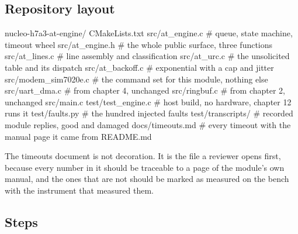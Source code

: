 \subsection*{Repository layout}

\begin{plaincode}
nucleo-h7a3-at-engine/
  CMakeLists.txt
  src/at_engine.c              # queue, state machine, timeout wheel
  src/at_engine.h              # the whole public surface, three functions
  src/at_lines.c               # line assembly and classification
  src/at_urc.c                 # the unsolicited table and its dispatch
  src/at_backoff.c             # exponential with a cap and jitter
  src/modem_sim7020e.c         # the command set for this module, nothing else
  src/uart_dma.c               # from chapter 4, unchanged
  src/ringbuf.c                # from chapter 2, unchanged
  src/main.c
  test/test_engine.c           # host build, no hardware, chapter 12 runs it
  test/faults.py               # the hundred injected faults
  test/transcripts/            # recorded module replies, good and damaged
  docs/timeouts.md             # every timeout with the manual page it came from
  README.md
\end{plaincode}

The timeouts document is not decoration. It is the file a reviewer opens first,
because every number in it should be traceable to a page of the module's own
manual, and the ones that are not should be marked as measured on the bench with
the instrument that measured them.

\subsection*{Steps}

